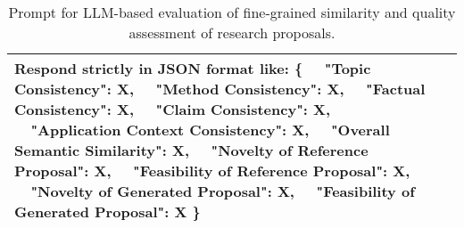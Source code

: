 \begin{table*}[ht]
\begin{tabular}{p{1cm}p{11.5cm}}
Respond strictly in JSON format like:\newline
\{\newline
\ \ "Topic Consistency": X,\newline
\ \ "Method Consistency": X,\newline
\ \ "Factual Consistency": X,\newline
\ \ "Claim Consistency": X,\newline
\ \ "Application Context Consistency": X,\newline
\ \ "Overall Semantic Similarity": X,\newline
\ \ "Novelty of Reference Proposal": X,\newline
\ \ "Feasibility of Reference Proposal": X,\newline
\ \ "Novelty of Generated Proposal": X,\newline
\ \ "Feasibility of Generated Proposal": X\newline
\}
\\
\bottomrule[1.5pt]
\end{tabular}
\caption{Prompt for LLM-based evaluation of fine-grained similarity and quality assessment of research proposals.}
\label{tab:Eval_Prompt_Finegrained}
\end{table*}



